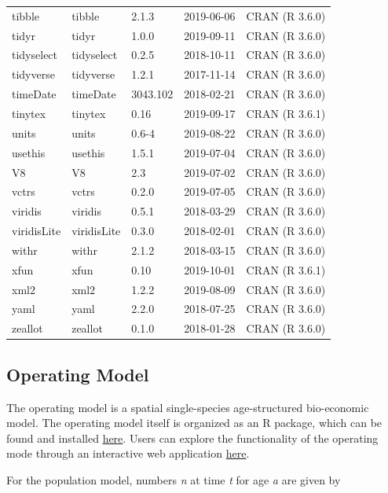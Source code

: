 \documentclass[]{article}
\begin{document}
\begin{longtable}[t]{lllll}
\addlinespace
tibble & tibble & 2.1.3 & 2019-06-06 & CRAN (R 3.6.0)\\
tidyr & tidyr & 1.0.0 & 2019-09-11 & CRAN (R 3.6.0)\\
tidyselect & tidyselect & 0.2.5 & 2018-10-11 & CRAN (R 3.6.0)\\
tidyverse & tidyverse & 1.2.1 & 2017-11-14 & CRAN (R 3.6.0)\\
timeDate & timeDate & 3043.102 & 2018-02-21 & CRAN (R 3.6.0)\\
\addlinespace
tinytex & tinytex & 0.16 & 2019-09-17 & CRAN (R 3.6.1)\\
units & units & 0.6-4 & 2019-08-22 & CRAN (R 3.6.0)\\
usethis & usethis & 1.5.1 & 2019-07-04 & CRAN (R 3.6.0)\\
V8 & V8 & 2.3 & 2019-07-02 & CRAN (R 3.6.0)\\
vctrs & vctrs & 0.2.0 & 2019-07-05 & CRAN (R 3.6.0)\\
\addlinespace
viridis & viridis & 0.5.1 & 2018-03-29 & CRAN (R 3.6.0)\\
viridisLite & viridisLite & 0.3.0 & 2018-02-01 & CRAN (R 3.6.0)\\
withr & withr & 2.1.2 & 2018-03-15 & CRAN (R 3.6.0)\\
xfun & xfun & 0.10 & 2019-10-01 & CRAN (R 3.6.1)\\
xml2 & xml2 & 1.2.2 & 2019-08-09 & CRAN (R 3.6.0)\\
\addlinespace
yaml & yaml & 2.2.0 & 2018-07-25 & CRAN (R 3.6.0)\\
zeallot & zeallot & 0.1.0 & 2018-01-28 & CRAN (R 3.6.0)\\*
\end{longtable}

\hypertarget{operating-model}{%
\subsection{Operating Model}\label{operating-model}}

The operating model is a spatial single-species age-structured bio-economic model. The operating model itself is organized as an R package, which can be found and installed \href{https://github.com/DanOvando/spasm}{here}. Users can explore the functionality of the operating mode through an interactive web application \href{https://danovando.shinyapps.io/simmpa/}{here}.

For the population model, numbers \emph{n} at time \emph{t} for age \emph{a} are given by
\end{document}
